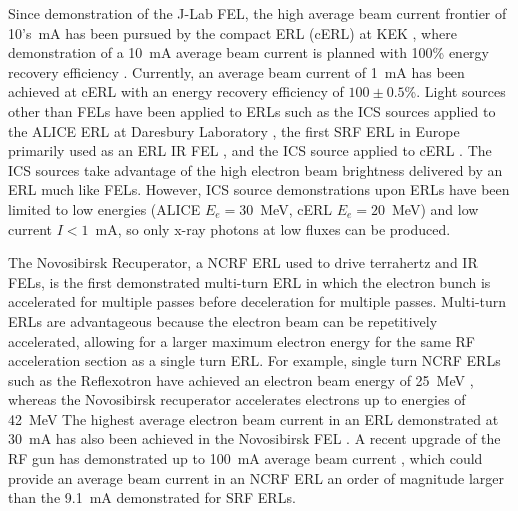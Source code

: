 \documentclass[../main.tex]{subfiles}
\begin{document}
Since demonstration of the J-Lab FEL, the high average beam current frontier of 10's~\si{\milli\ampere} has been pursued by the compact ERL (cERL) at KEK \cite{akagi2016narrow}, where demonstration of a 10~\si{\milli\ampere} average beam current is planned with 100\% energy recovery efficiency \cite{adolphsen2022european}. Currently, an average beam current of 1~\si{\milli\ampere} has been achieved at cERL \cite{obina20191} with an energy recovery efficiency of $100\pm 0.5$\%. Light sources other than FELs have been applied to ERLs such as the 
ICS sources applied to the ALICE ERL at Daresbury Laboratory \cite{priebe2008inverse,priebe2010first}, the first SRF ERL in Europe primarily used as an ERL IR FEL \cite{thompson2014status}, and the ICS source applied to cERL \cite{akagi2016narrow}. The ICS sources take advantage of the high electron beam brightness delivered by an ERL much like FELs. However, ICS source demonstrations upon ERLs have been limited to low energies (ALICE $E_{e}=30$~\si{\mega\electronvolt}, cERL  $E_{e}=20$~\si{\mega\electronvolt}) and low current $I < 1$~\si{\milli\ampere}, so only x-ray photons at low fluxes can be produced. 

The Novosibirsk Recuperator, a NCRF ERL used to drive terrahertz and IR FELs, is the first demonstrated multi-turn ERL \cite{gavrilov2007status} in which the electron bunch is accelerated for multiple passes before deceleration for multiple passes. Multi-turn ERLs are advantageous because the electron beam can be repetitively accelerated, allowing for a larger maximum electron energy for the same RF acceleration section as a single turn ERL. For example, single turn NCRF ERLs such as the Reflexotron have achieved an electron beam energy of 25~\si{\mega\electronvolt} \cite{schriber1977experimental}, whereas the Novosibirsk recuperator accelerates electrons up to energies of 42~\si{\mega\electronvolt} \cite{shevchenko2020novosibirsk}  The highest average electron beam current in an ERL demonstrated at 30~\si{\milli\ampere} has also been achieved in the Novosibirsk FEL \cite{gavrilov2007status}. A recent upgrade of the RF gun has demonstrated up to 100~\si{\milli\ampere} average beam current \cite{matveev2020simulation}, which could provide an average beam current in an NCRF ERL an order of magnitude larger than the 9.1~\si{\milli\ampere} \cite{neil2006jlab} demonstrated for SRF ERLs.  
\end{document}

